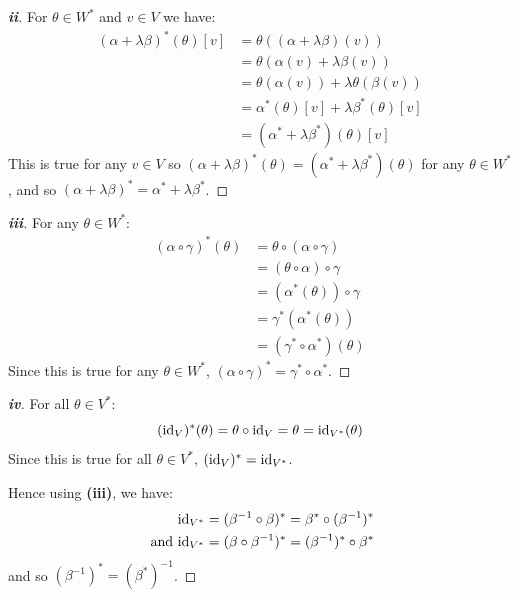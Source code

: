 \documentclass[../main.tex]{subfiles}
\begin{document}
\begin{proof}[\textbf{ii}]
  For $\theta \in W^{*}$ and $v \in V$ we have:
  \begin{align*}
    (\alpha + \lambda \beta)^{*}(\theta)[v] &= \theta((\alpha + \lambda \beta)(v)) \\
                                            &= \theta(\alpha(v) + \lambda \beta(v)) \\
                                            &= \theta(\alpha(v)) + \lambda \theta(\beta(v)) \\
                                            &= \alpha^{*}(\theta)[v] + \lambda \beta^{*}(\theta)[v] \\
                                            &= (\alpha^{*} + \lambda \beta^{*})(\theta)[v]
  \end{align*}
  This is true for any $v \in V$ so $(\alpha + \lambda \beta)^{*}(\theta) = (\alpha^{*} + \lambda \beta^{*})(\theta)$ for any $\theta \in W^{*}$, and so $(\alpha + \lambda \beta)^{*} = \alpha^{*} + \lambda \beta^{*}$.
\end{proof}
\begin{proof}[\textbf{iii}]
  For any $\theta \in W^{*}$:
  \begin{align*}
    (\alpha \circ \gamma)^{*}(\theta) &= \theta \circ (\alpha \circ \gamma) \\
                                      &= (\theta \circ \alpha) \circ \gamma \\
                                      &= (\alpha^{*}(\theta)) \circ \gamma \\
                                      &= \gamma^{*}(\alpha^{*}(\theta)) \\
                                      &= (\gamma^{*} \circ \alpha^{*})(\theta)
  \end{align*}
  Since this is true for any $\theta \in W^{*}$, $(\alpha \circ \gamma)^{*} = \gamma^{*} \circ \alpha^{*}$.
\end{proof}
\begin{proof}[\textbf{iv}]
  For all $\theta \in V^{*}$:
  \[
    (\mathrm{id}_V)^{*}(\theta) = \theta \circ \mathrm{id}_V = \theta = \mathrm{id}_{V^{*}}(\theta)
  \]
  Since this is true for all $\theta \in V^{*}$, $(\mathrm{id}_V)^{*} = \mathrm{id}_{V^{*}}$.

  Hence using \textbf{(iii)}, we have:
  \begin{align*}
    \mathrm{id}_{V^{*}} &= (\beta^{-1} \circ \beta)^{*} = \beta^{*} \circ (\beta^{-1})^{*} \\
    \text{ and } \mathrm{id}_{V^{*}} &= (\beta \circ \beta^{-1})^{*} = (\beta^{-1})^{*} \circ \beta^{*}
  \end{align*}
  and so $(\beta^{-1})^{*} = (\beta^{*})^{-1}$.
\end{proof}
\end{document}
